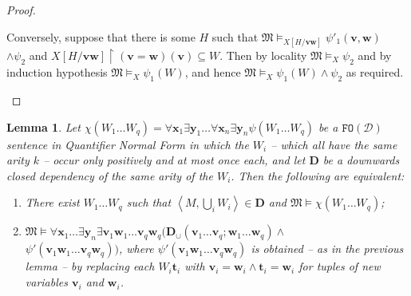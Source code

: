 \documentclass{article}
\newtheorem{Lemma}[Theorem]{Lemma}
\theoremstyle{definition}
\newcommand{\tuple}{\mathbf}
\newcommand{\FO}{\texttt{FO}}
\newcommand{\M}{\mathfrak M}
\newcommand{\D}{\mathbf D}
\newcommand{\DD}{\mathcal D}
\begin{document}
\begin{proof}
\begin{itemize}
			Conversely, suppose that there is some $H$ such that $\M \models_{X[H/\tuple v \tuple w]} \psi'_1(\tuple v, \tuple w) $\\$\wedge \psi_2$ and $X[H/\tuple v \tuple w]\upharpoonright (\tuple v = \tuple w)(\tuple v) \subseteq W$. Then by locality $\M \models_X \psi_2$ and by induction hypothesis $\M \models_{X} \psi_1(W)$, and hence $\M \models_X \psi_1(W) \wedge \psi_2$ as required. 
	\end{itemize}
\end{proof}
\begin{Lemma}
	Let $\chi(W_1 \ldots W_q) = \forall \tuple x_1 \exists \tuple y_1 \ldots \forall \tuple x_n \exists \tuple y_n \psi(W_1 \ldots W_q)$ be a $\FO(\DD)$ sentence in Quantifier Normal Form in which the $W_i$ -- which all have the same arity $k$ -- occur only positively and at most once each, and let $\D$ be a downwards closed dependency of the same arity of the $W_i$. Then the following are equivalent: 
	\begin{enumerate}
		\item There exist $W_1 \ldots W_q$ such that $\left \langle M, \bigcup_i W_i\right \rangle \in \D$ and $\M \models \chi(W_1 \ldots W_q)$; 
		\item $\M \models \forall \tuple x_1 \ldots \exists \tuple y_n \exists \tuple v_1 \tuple w_1 \ldots \tuple v_q \tuple w_q (\D_\cup(\tuple v_1 \ldots \tuple v_q; \tuple w_1 \ldots \tuple w_q) \wedge $\\$\psi'(\tuple v_1 \tuple w_1 \ldots \tuple v_q \tuple w_q))$, where $\psi'(\tuple v_1 \tuple w_1 \ldots \tuple v_q \tuple w_q)$ is obtained -- as in the previous lemma -- by replacing each $W_i \tuple t_i$ with $\tuple v_i = \tuple w_i \wedge \tuple t_i = \tuple w_i$ for tuples of new variables $\tuple v_i$ and $\tuple w_i$. 
	\end{enumerate}
	\label{lemma:putback}
\end{Lemma}
\end{document}
